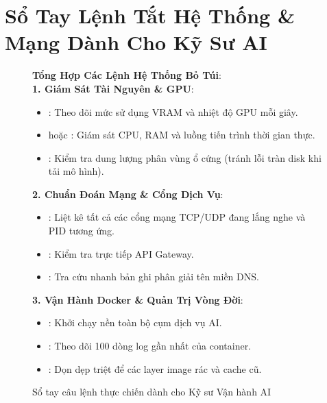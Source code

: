 \section{Sổ Tay Lệnh Tắt Hệ Thống \& Mạng Dành Cho Kỹ Sư AI}
\label{sec:appendix-cheatsheet}

\begin{figure}[htbp]
\centering
\begin{tcolorbox}[colback=boxbg,colframe=primarycolor,width=0.95\textwidth,arc=2pt]
\small
\textbf{Tổng Hợp Các Lệnh Hệ Thống Bỏ Túi}:\\[0.2cm]
\textbf{1. Giám Sát Tài Nguyên \& GPU}:
\begin{itemize}
  \item {}: Theo dõi mức sử dụng VRAM và nhiệt độ GPU mỗi giây.
  \item {} hoặc : Giám sát CPU, RAM và luồng tiến trình thời gian thực.
  \item {}: Kiểm tra dung lượng phân vùng ổ cứng (tránh lỗi tràn disk khi tải mô hình).
\end{itemize}
\textbf{2. Chuẩn Đoán Mạng \& Cổng Dịch Vụ}:
\begin{itemize}
  \item {}: Liệt kê tất cả các cổng mạng TCP/UDP đang lắng nghe và PID tương ứng.
  \item {}: Kiểm tra trực tiếp API Gateway.
  \item {}: Tra cứu nhanh bản ghi phân giải tên miền DNS.
\end{itemize}
\textbf{3. Vận Hành Docker \& Quản Trị Vòng Đời}:
\begin{itemize}
  \item {}: Khởi chạy nền toàn bộ cụm dịch vụ AI.
  \item {}: Theo dõi 100 dòng log gần nhất của container.
  \item {}: Dọn dẹp triệt để các layer image rác và cache cũ.
\end{itemize}
\end{tcolorbox}
\caption{Sổ tay câu lệnh thực chiến dành cho Kỹ sư Vận hành AI}
\label{fig:appendix-system-cheatsheet}
\end{figure}
